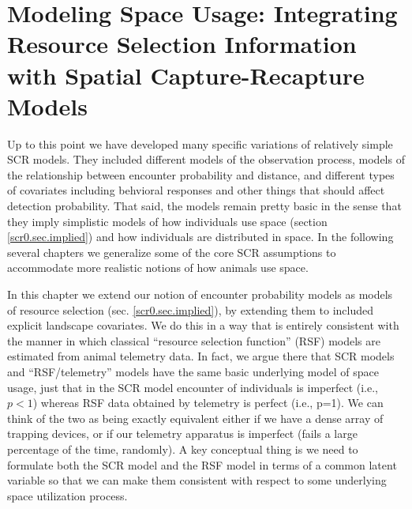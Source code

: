 \chapter{
Modeling Space Usage:
Integrating Resource Selection Information with
Spatial Capture-Recapture
  Models}

\label{chapt.rsf}


\vspace{.3in}

Up to this point we have developed many specific variations of
relatively simple SCR models. They included different models of the
observation process, models of the relationship between encounter
probability and distance, and different types of covariates including
behvioral responses and other things that should affect detection
probability.  That said, the models remain pretty basic in the sense
that they imply simplistic models of how individuals use space
(section \ref{scr0.sec.implied}) and how individuals are distributed
in space.  In the following several chapters we generalize some of the
core SCR assumptions to accommodate more realistic notions of how
animals use space.

In this chapter we extend our notion of encounter probability models
as models of resource selection (sec. \ref{scr0.sec.implied}), by
extending them to included explicit landscape covariates. We do this
in a way that is entirely consistent with the manner in which
classical ``resource selection function'' (RSF) models are estimated
from animal telemetry data.  In fact, we argue there that SCR models
and ``RSF/telemetry'' models have the same basic underlying model of
space usage, just that in the SCR model encounter of individuals is
imperfect (i.e., $p<1$) whereas RSF data obtained by telemetry is
perfect (i.e., p=1). We can think of the two as being exactly
equivalent either if we have a dense array of trapping devices, or if
our telemetry apparatus is imperfect (fails a large percentage of the
time, randomly).  A key conceptual thing is we need to formulate both
the SCR model and the RSF model in terms of a common latent variable
so that we can make them consistent with respect to some underlying
space utilization process.


